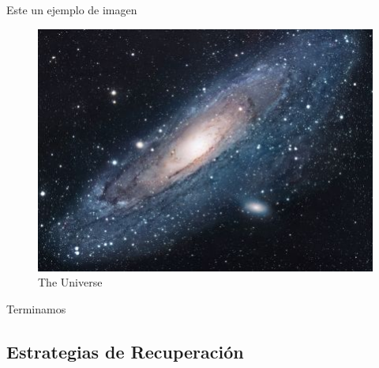 \begin{table}[ht]
\caption{Iteracion de Newton para $x^2-\cos(x)-1=0$ con $x_0=1.5$}
\end{table}


Este un ejemplo de imagen

\begin{figure}[ht]
\centering
\includegraphics[scale=1.7]{images/universe.jpg}
\caption{The Universe}
\label{fig:universe}
\end{figure}

Terminamos

\subsection{Estrategias de Recuperaci\'on}

